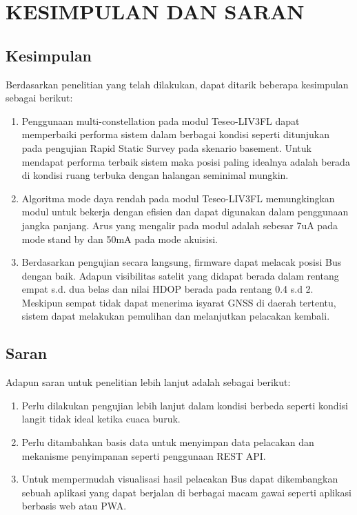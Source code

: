 \chapter{KESIMPULAN DAN SARAN}

\section{Kesimpulan}
Berdasarkan penelitian yang telah dilakukan, dapat ditarik beberapa kesimpulan sebagai berikut:
\begin{enumerate}
	\item Penggunaan multi-constellation pada modul Teseo-LIV3FL dapat memperbaiki performa sistem dalam berbagai kondisi seperti ditunjukan pada pengujian Rapid Static Survey pada skenario basement. Untuk mendapat performa terbaik sistem maka posisi paling idealnya adalah berada di kondisi ruang terbuka dengan halangan seminimal mungkin.
	\item Algoritma mode daya rendah pada modul Teseo-LIV3FL memungkingkan modul untuk bekerja dengan efisien dan dapat digunakan dalam penggunaan jangka panjang. Arus yang mengalir pada modul adalah sebesar 7uA pada mode stand by dan 50mA pada mode akuisisi.
	\item Berdasarkan pengujian secara langsung, firmware dapat melacak posisi Bus dengan baik. Adapun visibilitas satelit yang didapat berada dalam rentang empat s.d. dua belas dan nilai HDOP berada pada rentang 0.4 s.d 2. Meskipun sempat tidak dapat menerima isyarat GNSS di daerah tertentu, sistem dapat melakukan pemulihan dan melanjutkan pelacakan kembali.
\end{enumerate}

\section{Saran}
Adapun saran untuk penelitian lebih lanjut adalah sebagai berikut:
\begin{enumerate}
	\item Perlu dilakukan pengujian lebih lanjut dalam kondisi berbeda seperti kondisi langit tidak ideal ketika cuaca buruk.
	\item Perlu ditambahkan basis data untuk menyimpan data pelacakan dan mekanisme penyimpanan seperti penggunaan REST API.
	\item Untuk mempermudah visualisasi hasil pelacakan Bus dapat dikembangkan sebuah aplikasi yang dapat berjalan di berbagai macam gawai seperti aplikasi berbasis web atau PWA.
\end{enumerate}

